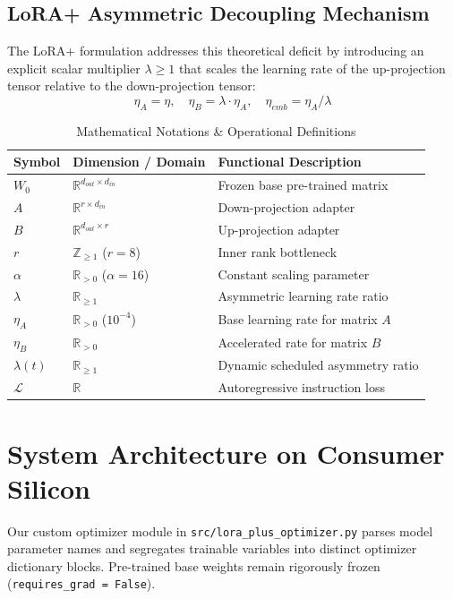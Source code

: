\documentclass[conference]{IEEEtran}
\begin{document}
\subsection{LoRA+ Asymmetric Decoupling Mechanism}
The LoRA+ formulation addresses this theoretical deficit by introducing an explicit scalar multiplier $\lambda \ge 1$ that scales the learning rate of the up-projection tensor relative to the down-projection tensor:
\begin{equation}
\eta_A = \eta, \quad \eta_B = \lambda \cdot \eta_A, \quad \eta_{emb} = \eta_A / \lambda
\end{equation}

\begin{table}[htbp]
\caption{Mathematical Notations \& Operational Definitions}
\begin{center}
\begin{tabular}{lll}
\toprule
\textbf{Symbol} & \textbf{Dimension / Domain} & \textbf{Functional Description} \\
\midrule
$W_0$ & $\mathbb{R}^{d_{out} \times d_{in}}$ & Frozen base pre-trained matrix \\
$A$ & $\mathbb{R}^{r \times d_{in}}$ & Down-projection adapter \\
$B$ & $\mathbb{R}^{d_{out} \times r}$ & Up-projection adapter \\
$r$ & $\mathbb{Z}_{\ge 1}$ ($r=8$) & Inner rank bottleneck \\
$\alpha$ & $\mathbb{R}_{>0}$ ($\alpha=16$) & Constant scaling parameter \\
$\lambda$ & $\mathbb{R}_{\ge 1}$ & Asymmetric learning rate ratio \\
$\eta_A$ & $\mathbb{R}_{>0}$ ($10^{-4}$) & Base learning rate for matrix $A$ \\
$\eta_B$ & $\mathbb{R}_{>0}$ & Accelerated rate for matrix $B$ \\
$\lambda(t)$ & $\mathbb{R}_{\ge 1}$ & Dynamic scheduled asymmetry ratio \\
$\mathcal{L}$ & $\mathbb{R}$ & Autoregressive instruction loss \\
\bottomrule
\end{tabular}
\label{tab:notations}
\end{center}
\end{table}

\section{System Architecture on Consumer Silicon}
Our custom optimizer module in \texttt{src/lora\_plus\_optimizer.py} parses model parameter names and segregates trainable variables into distinct optimizer dictionary blocks. Pre-trained base weights remain rigorously frozen (\texttt{requires\_grad = False}).
\end{document}
